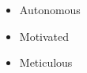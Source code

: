 %
%
%

\twocolumnsection
{
\begin{skills}
\end{skills}}
{
\vspace{1em}
\begin{itemize}
	\item Autonomous
	\item Motivated                
    \item Meticulous
\end{itemize}
}
